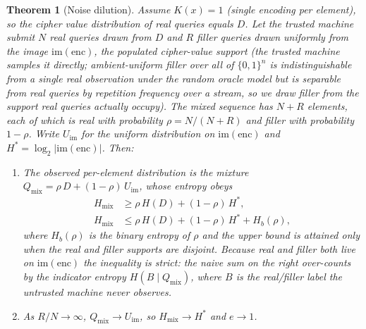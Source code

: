 \documentclass[conference]{IEEEtran}
\theoremstyle{definition}
\theoremstyle{plain}
\newtheorem{theorem}{Theorem}[section]
\theoremstyle{remark}
\newcommand{\enc}{\mathrm{enc}}
\newcommand{\B}{\{0,1\}}
\begin{document}
\begin{theorem}[Noise dilution]
\label{thm:noise-dilution}
Assume $K(x) = 1$ (single encoding per element), so the cipher value
distribution of real queries equals $D$.
Let the trusted machine submit $N$ real queries drawn from $D$ and
$R$ filler queries drawn uniformly from the image $\mathrm{im}(\enc)$,
the populated cipher-value support (the trusted machine samples it
directly; ambient-uniform filler over all of $\B^n$ is indistinguishable
from a single real observation under the random oracle model but is
separable from real queries by repetition frequency over a stream, so we
draw filler from the support real queries actually occupy).  The mixed
sequence has $N + R$ elements, each of which is real with probability
$\rho = N / (N + R)$ and filler with probability $1 - \rho$.  Write
$U_{\mathrm{im}}$ for the uniform distribution on $\mathrm{im}(\enc)$ and
$H^* = \log_2|\mathrm{im}(\enc)|$.  Then:
\begin{enumerate}
\item The observed per-element distribution is the mixture
  $Q_{\mathrm{mix}} = \rho\,D + (1 - \rho)\,U_{\mathrm{im}}$, whose
  entropy obeys
\begin{equation}
\label{eq:noise-entropy}
\begin{aligned}
H_{\mathrm{mix}} &\geq \rho\,H(D) + (1 - \rho)\,H^*,\\
H_{\mathrm{mix}} &\leq \rho\,H(D) + (1 - \rho)\,H^* + H_b(\rho),
\end{aligned}
\end{equation}
where $H_b(\rho)$ is the binary entropy of $\rho$ and the upper bound is
attained only when the real and filler supports are disjoint.  Because
real and filler both live on $\mathrm{im}(\enc)$ the inequality is
strict: the naive sum on the right over-counts by the indicator entropy
$H(B \mid Q_{\mathrm{mix}})$, where $B$ is the real/filler label the
untrusted machine never observes.

\item As $R/N \to \infty$, $Q_{\mathrm{mix}} \to U_{\mathrm{im}}$, so
  $H_{\mathrm{mix}} \to H^*$ and $e \to 1$.


\end{enumerate}
\end{theorem}
\end{document}

